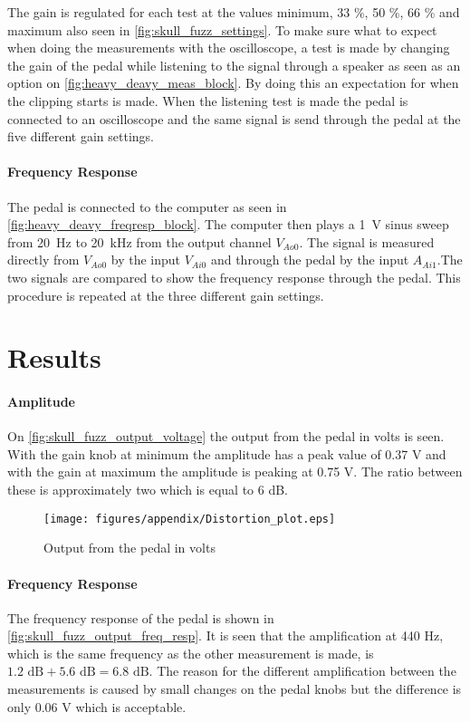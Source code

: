 The gain is regulated for each test at the values minimum, 33 \%, 50 \%, 66 \% and maximum also seen in \autoref{fig:skull_fuzz_settings}. To make sure what to expect when doing the measurements with the oscilloscope, a test is made by changing the gain of the pedal while listening to the signal through a speaker as seen as an option on \autoref{fig:heavy_deavy_meas_block}. By doing this an expectation for when the clipping starts is made. When the listening test is made the pedal is connected to an oscilloscope and the same signal is send through the pedal at the five different gain settings. 

\paragraph*{Frequency Response}

The pedal is connected to the computer as seen in \autoref{fig:heavy_deavy_freqresp_block}. The computer then plays a \SI{1}{\volt} sinus sweep from \SI{20}{\hertz} to \SI{20}{\kilo \hertz} from the output channel $V_{Ao0}$. The signal is measured directly from $V_{Ao0}$ by the input $V_{Ai0}$ and through the pedal by the input $A_{Ai1}$.The two signals are compared to show the frequency response through the pedal. This procedure is repeated at the three different gain settings.


\section{Results}
\paragraph*{Amplitude}
On \autoref{fig:skull_fuzz_output_voltage} the output from the pedal in volts is seen. With the gain knob at minimum the amplitude has a peak value of 0.37 V and with the gain at maximum the amplitude is peaking at 0.75 V. The ratio between these is approximately two which is equal to 6 dB. 

\begin{figure}[htbp]
	\centering
	\texttt{[image: figures/appendix/Distortion\_plot.eps]}
	\caption{Output from the pedal in volts}
	\label{fig:skull_fuzz_output_voltage}
\end{figure}


\paragraph*{Frequency Response}
The frequency response of the pedal is shown in \autoref{fig:skull_fuzz_output_freq_resp}. It is seen that the amplification at 440 Hz, which is the same frequency as the other measurement is made, is $1.2\text{ dB} + 5.6\text{ dB} = 6.8\text{ dB}$. The reason for the different amplification between the measurements is caused by small changes on the pedal knobs but the difference is only 0.06 V which is acceptable. 

